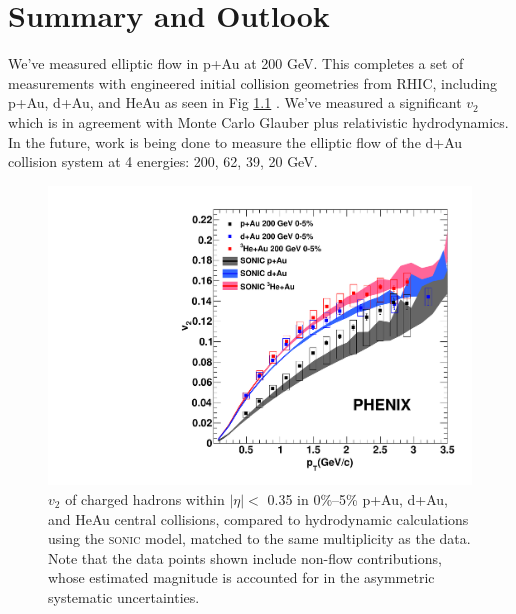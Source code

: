 \chapter{Summary and Outlook}
We've measured elliptic flow in p+Au at 200 GeV. This completes a set of measurements with engineered initial collision geometries from RHIC, including p+Au, d+Au, and HeAu as seen in Fig \ref{fig:all_system_hydro_6} . We've measured a significant $v_2$ which is in agreement with Monte Carlo Glauber plus relativistic hydrodynamics.
In the future, work is being done to measure the elliptic flow of the d+Au collision system at 4 energies: 200, 62, 39, 20 GeV. 
\begin{figure}
\begin{center}
\includegraphics[width=0.5\linewidth]{figs/three_system_comparison_result.pdf}
\caption{$v_2$ of charged hadrons within $|\eta| <$ 0.35 in 0\%--5\% p+Au, d+Au, and HeAu central collisions, compared to hydrodynamic calculations using the \textsc{sonic} model, matched to the same multiplicity as the data. Note that the data points shown include non-flow contributions, whose estimated magnitude is accounted for in the asymmetric systematic uncertainties.}
\label{fig:all_system_hydro_6}
\end{center}
\end{figure}
